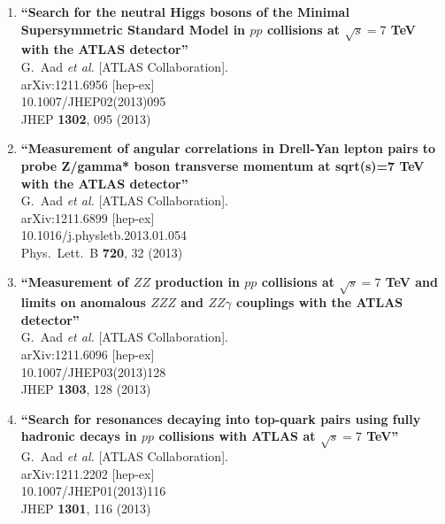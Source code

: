 \documentclass{article}
\begin{document}
\begin{enumerate}
\item%
{\bf ``Search for the neutral Higgs bosons of the Minimal Supersymmetric Standard Model in $pp$ collisions at $\sqrt{s}=7$ TeV with the ATLAS detector''}
  \\{}G.~Aad {\it et al.}  [ATLAS Collaboration].
  \\{}arXiv:1211.6956 [hep-ex]
    \\{}10.1007/JHEP02(2013)095
\\{}JHEP {\bf 1302}, 095 (2013) %


\item%
{\bf ``Measurement of angular correlations in Drell-Yan lepton pairs to probe Z/gamma* boson transverse momentum at sqrt(s)=7 TeV with the ATLAS detector''}
  \\{}G.~Aad {\it et al.}  [ATLAS Collaboration].
  \\{}arXiv:1211.6899 [hep-ex]
    \\{}10.1016/j.physletb.2013.01.054
\\{}Phys.\ Lett.\ B {\bf 720}, 32 (2013) %


\item%
{\bf ``Measurement of $ZZ$ production in $pp$ collisions at $\sqrt{s}=7$ TeV and limits on anomalous $ZZZ$ and $ZZ\gamma$ couplings with the ATLAS detector''}
  \\{}G.~Aad {\it et al.}  [ATLAS Collaboration].
  \\{}arXiv:1211.6096 [hep-ex]
    \\{}10.1007/JHEP03(2013)128
\\{}JHEP {\bf 1303}, 128 (2013) %


\item%
{\bf ``Search for resonances decaying into top-quark pairs using fully hadronic decays in $pp$ collisions with ATLAS at $\sqrt{s}=7$ TeV''}
  \\{}G.~Aad {\it et al.}  [ATLAS Collaboration].
  \\{}arXiv:1211.2202 [hep-ex]
    \\{}10.1007/JHEP01(2013)116
\\{}JHEP {\bf 1301}, 116 (2013) %



\end{enumerate}
\end{document}

